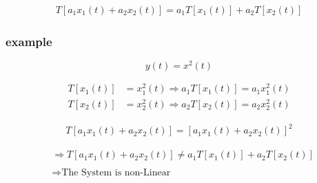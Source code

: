 \documentclass[12pt]{article}
\begin{document}
\begin{align*}
T[ a_{1}x_{1}(t) + a_{2}x_{2}(t) ] = a_{1}T[x_{1}(t)] + a_{2} T[x_{2}(t)]
\end{align*}




\begin{center}
\end{center}


\subsubsection{example}

$$
y(t) = x^{2}(t)
$$


\begin{align*}
T[x_{1}(t)] &=  x_{1}^{2}(t) \Rightarrow a_{1} T[x_{1}(t)] = a_{1} x_{1}^{2}(t)  \\ 
T[x_{2}(t)] &=  x_{2}^{2}(t) \Rightarrow a_{2} T[x_{2}(t)] = a_{2} x_{2}^{2}(t)
\end{align*}






\begin{align*}
T[ a_{1}x_{1}(t) + a_{2}x_{2}(t) ] = [ a_{1}x_{1}(t) + a_{2}x_{2}(t) ]^{2} 
\end{align*}






\begin{align*}
&\Rightarrow T[ a_{1}x_{1}(t) + a_{2}x_{2}(t) ] \neq a_{1} T[x_{1}(t)] + a_{2} T[x_{2}(t)] \\ \\
&\Rightarrow \text{The System is non-Linear}
\end{align*}
\end{document}
